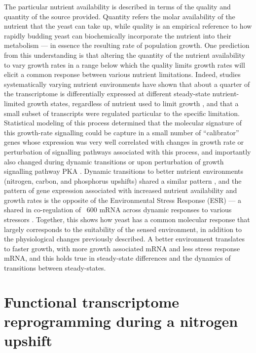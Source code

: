 The particular nutrient availability is described in terms of the 
quality and quantity of the source provided. Quantity refers 
the molar availability of the nutrient that the yeast can take up,
while quality is an empirical reference to how rapidly budding
yeast can biochemically incorporate the nutrient into their metabolism
--- in essence the resulting rate of population growth. 
One prediction from this understanding is that
altering the quantity of the nutrient availability to vary growth
rates in a range below which the quality limits growth rates will
elicit a common response between various nutrient limitations.
Indeed, studies systematically varying nutrient environments have
shown that about a quarter of the transcriptome is differentially
expressed at different steady-state nutrient-limited growth states,
regardless of nutrient used to limit growth 
\parencite{brauer2008coordination,regenberg2006growth}, and that a
small subset of transcripts were regulated particular to the specific
limitation. 
Statistical modeling of this process
determined that the molecular signature of this growth-rate signalling
could be capture in a small number of “calibrator” genes whose
expression was very well correlated with changes in growth rate or
perturbation of signalling pathways associated with this process, and
importantly also changed during dynamic transitions or upon
perturbation of growth signalling pathway PKA 
\parencite{airoldi2009predicting}.
Dynamic transitions to better nutrient environments (nitrogen, carbon,
and phosphorus upshifts) shared a similar pattern 
\parencite{conway2012glucose}, 
and the pattern of gene expression associated with increased
nutrient availability and growth rates is the opposite of the
Environmental Stress Response (ESR) --- a shared in co-regulation of
~600 mRNA across dynamic responses to various stressors 
\parencite{gasch2000genomic}. 
Together, this shows how yeast has a common molecular response that
largely corresponds to the suitability of the sensed environment,
in addition to the physiological changes previously described.
A better environment translates to faster growth, with
more growth associated mRNA and less stress response mRNA, and this
holds true in steady-state differences and the dynamics of 
transitions between steady-states.

\section{Functional transcriptome reprogramming during a
nitrogen upshift}

